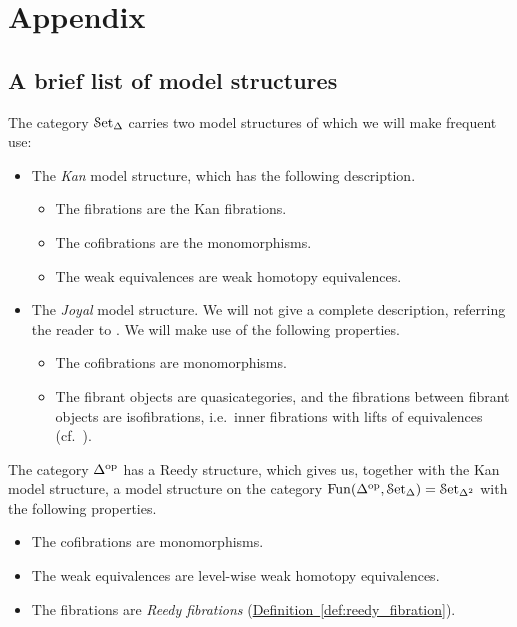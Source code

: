 \documentclass[main.tex]{subfiles}
\begin{document}
\appendix

\section{Appendix}

\subsection{A brief list of model structures}
\label{sss:a_brief_list_of_model_structures}

The category $\mathcal{S}\mathrm{et}_{\Delta}$ carries two model structures of which we will make frequent use:
\begin{itemize}
  \item The \emph{Kan} model structure, which has the following description.
    \begin{itemize}
      \item The fibrations are the Kan fibrations.

      \item The cofibrations are the monomorphisms.

      \item The weak equivalences are weak homotopy equivalences.
    \end{itemize}

  \item The \emph{Joyal} model structure. We will not give a complete description, referring the reader to \cite[Sec.\ 2.2.5]{highertopostheory}. We will make use of the following properties.
    \begin{itemize}
      \item The cofibrations are monomorphisms.

      \item The fibrant objects are quasicategories, and the fibrations between fibrant objects are isofibrations, i.e.\ inner fibrations with lifts of equivalences (cf.\ \cite[Cor.\ 2.6.5]{highertopostheory}).
    \end{itemize}
\end{itemize}

The category $\Delta^{\mathrm{op}}$ has a Reedy structure, which gives us, together with the Kan model structure, a model structure on the category $\mathrm{Fun}(\Delta^{\mathrm{op}}, \mathcal{S}\mathrm{et}_{\Delta}) = \mathcal{S}\mathrm{et}_{\Delta^{2}}$ with the following properties.
\begin{itemize}
  \item The cofibrations are monomorphisms.

  \item The weak equivalences are level-wise weak homotopy equivalences.

  \item The fibrations are \emph{Reedy fibrations} (\hyperref[def:reedy_fibration]{Definition~\ref*{def:reedy_fibration}}).
\end{itemize}
\end{document}
